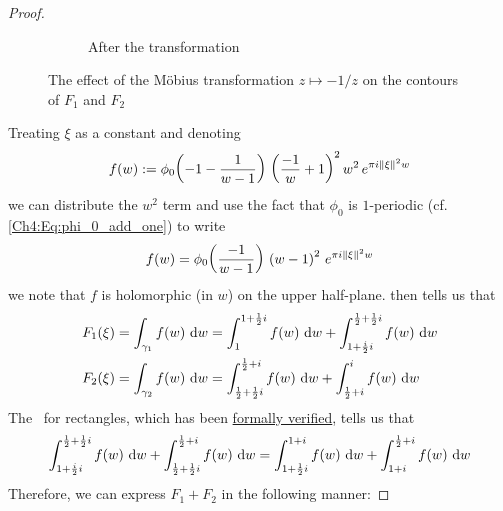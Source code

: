 \begin{proof}
\begin{figure}[htb]
\begin{subfigure}{0.4\linewidth}
            \caption{After the transformation}
        \end{subfigure}
        \caption{The effect of the Möbius transformation $z \mapsto -1/z$ on the contours of $F_1$ and $F_2$}
        \label{Ch4:Fig:Eigenfunction_Mobius_Contours}
    \end{figure}
    Treating $\xi$ as a constant and denoting
    \begin{align*}
        f(w) := \phi_0\!\left( -1 - \frac{1}{w - 1} \right) \, \left( \frac{-1}{w} + 1 \right)^2 w^2 \, e^{\pi i \left\lVert \xi \right\rVert^2 w}
    \end{align*}
    we can distribute the $w^2$ term and use the fact that $\phi_0$ is $1$-periodic (cf. \eqref{Ch4:Eq:phi_0_add_one}) to write
    \begin{align*}
        f(w) = \phi_0\!\left( \frac{-1}{w - 1} \right) \, \left( w - 1 \right)^2 \, e^{\pi i \left\lVert \xi \right\rVert^2 w}
    \end{align*}
    we note that $f$ is holomorphic (in $w$) on the upper half-plane.  then tells us that
    \begin{align*}
        F_1\of{\xi}
        &= \int_{\gamma_1} f(w) \, \diff{w}
        = \int_{1}^{1 + \frac{1}{2}i} f(w) \, \diff{w}
        + \int_{1 + \frac{i}{2}i}^{\frac{1}{2} + \frac{1}{2}i} f(w) \, \diff{w} \\
        F_2\of{\xi}
        &= \int_{\gamma_2} f(w) \, \diff{w}
        = \int_{\frac{1}{2} + \frac{1}{2}i}^{\frac{1}{2} + i} f(w) \, \diff{w}
        + \int_{\frac{1}{2} + i}^{i} f(w) \, \diff{w}
    \end{align*}
    The \CGT\ for rectangles, which has been \href{https://github.com/leanprover-community/mathlib4/blob/88928cefd7edb1ba61623bffd4e86389dfe1f648/Mathlib/Analysis/Complex/CauchyIntegral.lean#L245}{formally verified}, tells us that
    \begin{align*}
        \int_{1 + \frac{i}{2}i}^{\frac{1}{2} + \frac{1}{2}i} f(w) \, \operatorname{d}\!{w}
        + \int_{\frac{1}{2} + \frac{1}{2}i}^{\frac{1}{2} + i} f(w) \, \operatorname{d}\!{w}
        = \int_{1 + \frac{1}{2}i}^{1+i} f(w) \, \operatorname{d}\!{w}
        + \int_{1+i}^{\frac{1}{2} + i} f(w) \, \operatorname{d}\!{w}
    \end{align*}
    Therefore, we can express $F_1 + F_2$ in the following manner:

\end{proof}
